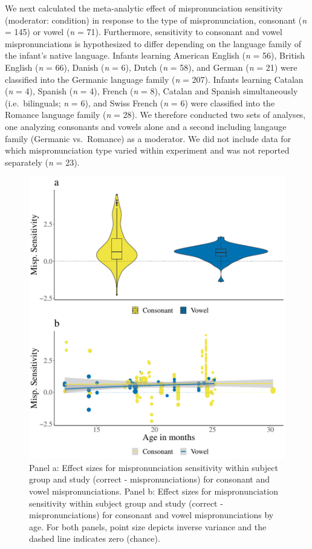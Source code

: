 \documentclass[
  english,
  man, noextraspace]{apa6}
\begin{document}
We next calculated the meta-analytic effect of mispronunciation sensitivity (moderator: condition) in response to the type of mispronunciation, consonant (\emph{n} = 145) or vowel (\emph{n} = 71). Furthermore, sensitivity to consonant and vowel mispronunciations is hypothesized to differ depending on the language family of the infant's native language. Infants learning American English (\emph{n} = 56), British English (\emph{n} = 66), Danish (\emph{n} = 6), Dutch (\emph{n} = 58), and German (\emph{n} = 21) were classified into the Germanic language family (\emph{n} = 207). Infants learning Catalan (\emph{n} = 4), Spanish (\emph{n} = 4), French (\emph{n} = 8), Catalan and Spanish simultaneously (i.e.~bilinguals; \emph{n} = 6), and Swiss French (\emph{n} = 6) were classified into the Romance language family (\emph{n} = 28). We therefore conducted two sets of analyses, one analyzing consonants and vowels alone and a second including langauge family (Germanic vs.~Romance) as a moderator. We did not include data for which mispronunciation type varied within experiment and was not reported separately (\emph{n} = 23).

\begin{figure}
\centering
\includegraphics{VonHolzenBergmann_MPMetaAnalysis_files/figure-latex/PlotMispType-1.pdf}
\caption{\label{fig:PlotMispType}Panel a: Effect sizes for mispronunciation sensitivity within subject group and study (correct - mispronunciations) for consonant and vowel mispronunciations. Panel b: Effect sizes for mispronunciation sensitivity within subject group and study (correct - mispronunciations) for consonant and vowel mispronunciations by age. For both panels, point size depicts inverse variance and the dashed line indicates zero (chance).}
\end{figure}
\end{document}
